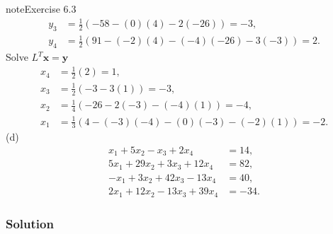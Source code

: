 \documentclass[letterpaper,10pt,english]{jupyterBook}
\begin{document}
\begin{sphinxadmonition}{note}{Exercise 6.3}
\begin{align*}
    y_{3} &= \frac{1}{2} \left( -58 - \left( 0 \right) \left( 4 \right) - 2 \left( -26 \right)\right) = -3, \\
    y_{4} &= \frac{1}{2} \left( 91 - \left( -2 \right) \left( 4 \right) - \left( -4 \right) \left( -26 \right) - 3 \left( -3 \right)\right) = 2.
\end{align*}
\sphinxAtStartPar
Solve \(L^T \mathbf{x} = \mathbf{y}\)
\begin{align*}
    x_{4} &= \frac{1}{2} \left(2 \right) = 1, \\
    x_{3} &= \frac{1}{2} \left(-3 - 3 \left( 1 \right) \right) = -3, \\
    x_{2} &= \frac{1}{4} \left(-26 - 2 \left( -3 \right) - \left( -4 \right) \left( 1 \right) \right) = -4, \\
    x_{1} &= \frac{1}{3} \left(4 - \left( -3 \right) \left( -4 \right) - \left( 0 \right) \left( -3 \right) - \left( -2 \right) \left( 1 \right) \right) = -2.
\end{align*}
\sphinxAtStartPar
(d)
\begin{align*}
    x_1 +5x_2 -x_3 +2x_4 &=14,\\
    5x_1 +29x_2 +3x_3 +12x_4 &=82,\\
    -x_1 +3x_2 +42x_3 -13x_4 &=40,\\
    2x_1 +12x_2 -13x_3 +39x_4 &=-34.
\end{align*}\subsubsection*{Solution}


\end{sphinxadmonition}
\end{document}
